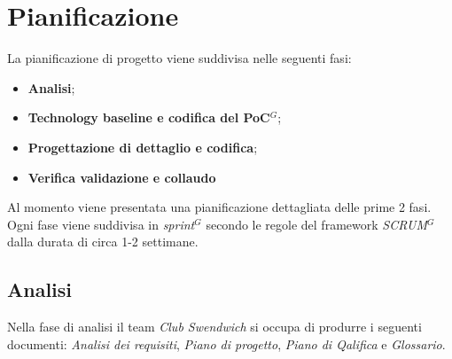 \section{Pianificazione}
La pianificazione di progetto viene suddivisa nelle seguenti fasi:
\begin{itemize}
    \item \textbf{Analisi};
    \item \textbf{Technology baseline e codifica del PoC$^{G}$};
    \item \textbf{Progettazione di dettaglio e codifica};
    \item \textbf{Verifica validazione e collaudo}
\end{itemize} 
Al momento viene presentata una pianificazione dettagliata delle prime 2 fasi. Ogni fase viene suddivisa in \textit{sprint}$^{G}$ secondo le regole
del framework \textit{SCRUM}$^{G}$ dalla durata di circa 1-2 settimane. 

\subsection{Analisi}
Nella fase di analisi il team \textit{Club Swendwich} si occupa di produrre i seguenti documenti: \textit{Analisi dei requisiti}, \textit{Piano di progetto}, \textit{Piano di Qalifica} e \textit{Glossario}.

